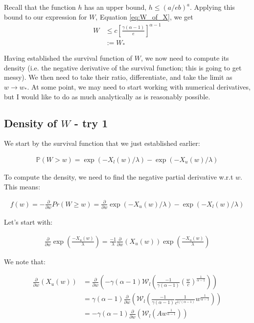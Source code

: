 \documentclass{article}
\newcommand{\bP}{\mathbb{P}}
\newcommand{\sW}{\mathscr{W}}
\begin{document}
Recall that the function $h$ has an upper bound, $h \leq (a / eb)^a$. Applying this bound to our expression for $W$, Equation \eqref{eq:W_of_X}, we get
\begin{align}
W &\leq c \left[ \frac{\gamma (\alpha - 1)}{e} \right]^{\alpha - 1} \label{eq:W_max}\\
&:= W_* \nonumber
\end{align}

Having established the survival function of $W$, we now need to compute its density (i.e. the negative derivative of the survival function; this is going to get messy). We then need to take their ratio, differentiate, and take the limit as $w \rightarrow w_*$. At some point, we may need to start working with numerical derivatives, but I would like to do as much analytically as is reasonably possible.

\subsection{Density of $W$ - try 1}

We start by the survival function that we just established earlier:

\begin{align}
\bP(W > w) = \exp(-X_l(w)/ \lambda) - \exp(-X_u(w)/\lambda)
\end{align}

To compute the density, we need to find the negative partial derivative w.r.t $w$. This means: 

\begin{align}
f(w) = - \frac{\partial}{\partial w} Pr(W \ge w) = \frac{\partial}{\partial w} \exp(-X_u(w)/ \lambda) - \exp(-X_l(w)/\lambda)
\end{align}

Let's start with:

\begin{align}
\frac{\partial}{\partial w} \exp \left( \frac{-X_{u}(w)}{\lambda} \right) = \frac{-1}{\lambda} \frac{\partial}{\partial w}(X_{u}(w)) \exp(\frac{-X_{u}(w)}{\lambda})
\end{align}

We note that:

\begin{align}
\frac{\partial}{\partial w}(X_{u}(w)) &= \frac{\partial}{\partial w} \left( -\gamma (\alpha - 1) \sW_l \left( \frac{-1}{\gamma (\alpha-1)} \left(\frac{w}{c}\right)^{\frac{1}{\alpha-1}} \right) \right) \\
&= \gamma (\alpha - 1) \frac{\partial}{\partial w} \left( \sW_l(\frac{-1}{\gamma (\alpha-1)} \frac{1}{c^{1/(\alpha-1)}} w^{\frac{1}{\alpha-1}})  \right) \\
&= -\gamma (\alpha-1) \frac{\partial}{\partial w} \left( \sW_l(A w^{\frac{1}{\alpha-1}}) \right)
\end{align}
\end{document}
